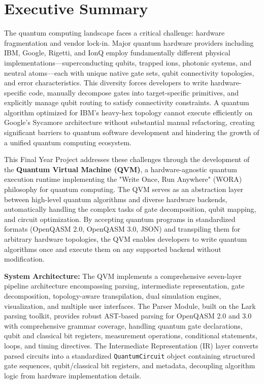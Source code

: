 
\chapter*{Executive Summary}

The quantum computing landscape faces a critical challenge: hardware fragmentation and vendor lock-in. Major quantum hardware providers including IBM, Google, Rigetti, and IonQ employ fundamentally different physical implementations—superconducting qubits, trapped ions, photonic systems, and neutral atoms—each with unique native gate sets, qubit connectivity topologies, and error characteristics. This diversity forces developers to write hardware-specific code, manually decompose gates into target-specific primitives, and explicitly manage qubit routing to satisfy connectivity constraints. A quantum algorithm optimized for IBM's heavy-hex topology cannot execute efficiently on Google's Sycamore architecture without substantial manual refactoring, creating significant barriers to quantum software development and hindering the growth of a unified quantum computing ecosystem.

This Final Year Project addresses these challenges through the development of the \textbf{Quantum Virtual Machine (QVM)}, a hardware-agnostic quantum execution runtime implementing the "Write Once, Run Anywhere" (WORA) philosophy for quantum computing. The QVM serves as an abstraction layer between high-level quantum algorithms and diverse hardware backends, automatically handling the complex tasks of gate decomposition, qubit mapping, and circuit optimization. By accepting quantum programs in standardized formats (OpenQASM 2.0, OpenQASM 3.0, JSON) and transpiling them for arbitrary hardware topologies, the QVM enables developers to write quantum algorithms once and execute them on any supported backend without modification.

\textbf{System Architecture:} The QVM implements a comprehensive seven-layer pipeline architecture encompassing parsing, intermediate representation, gate decomposition, topology-aware transpilation, dual simulation engines, visualization, and multiple user interfaces. The Parser Module, built on the Lark parsing toolkit, provides robust AST-based parsing for OpenQASM 2.0 and 3.0 with comprehensive grammar coverage, handling quantum gate declarations, qubit and classical bit registers, measurement operations, conditional statements, loops, and timing directives. The Intermediate Representation (IR) layer converts parsed circuits into a standardized \texttt{QuantumCircuit} object containing structured gate sequences, qubit/classical bit registers, and metadata, decoupling algorithm logic from hardware implementation details.

